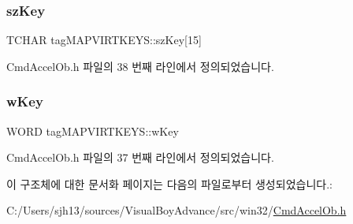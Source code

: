 \subsubsection{\texorpdfstring{sz\+Key}{szKey}}
{\footnotesize\ttfamily T\+C\+H\+AR tag\+M\+A\+P\+V\+I\+R\+T\+K\+E\+Y\+S\+::sz\+Key\mbox{[}15\mbox{]}}



Cmd\+Accel\+Ob.\+h 파일의 38 번째 라인에서 정의되었습니다.

\mbox{\label{structtag_m_a_p_v_i_r_t_k_e_y_s_aa21999ab90fcd0989352e3914fd796d7}} 
\subsubsection{\texorpdfstring{w\+Key}{wKey}}
{\footnotesize\ttfamily W\+O\+RD tag\+M\+A\+P\+V\+I\+R\+T\+K\+E\+Y\+S\+::w\+Key}



Cmd\+Accel\+Ob.\+h 파일의 37 번째 라인에서 정의되었습니다.



이 구조체에 대한 문서화 페이지는 다음의 파일로부터 생성되었습니다.\+:\begin{DoxyCompactItemize}
\item 
C\+:/\+Users/sjh13/sources/\+Visual\+Boy\+Advance/src/win32/\mbox{\hyperlink{_cmd_accel_ob_8h}{Cmd\+Accel\+Ob.\+h}}\end{DoxyCompactItemize}
